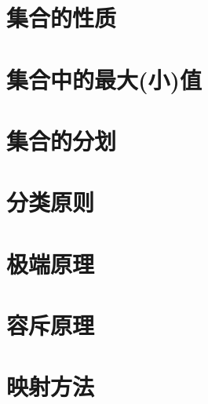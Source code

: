 \section{集合的性质}
\section{集合中的最大(小)值}
\section{集合的分划}
\section{分类原则}
\section{极端原理}
\section{ 容斥原理}
\section{ 映射方法}